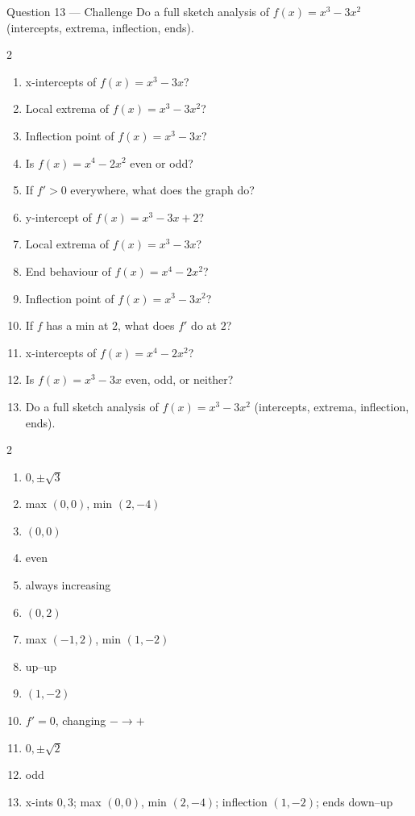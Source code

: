 \documentclass[11pt]{article}
\begin{document}
\begin{qbox}{Question 13 --- Challenge}
Do a full sketch analysis of $f(x)=x^3-3x^2$ (intercepts, extrema, inflection, ends).\workspace{4cm}
\end{qbox}

\clearpage
{}

\begin{recapbox}
\begin{multicols}{2}
\small
\begin{enumerate}[leftmargin=*,itemsep=3pt]
  \item x-intercepts of $f(x)=x^3-3x$?
  \item Local extrema of $f(x)=x^3-3x^2$?
  \item Inflection point of $f(x)=x^3-3x$?
  \item Is $f(x)=x^4-2x^2$ even or odd?
  \item If $f'>0$ everywhere, what does the graph do?
  \item y-intercept of $f(x)=x^3-3x+2$?
  \item Local extrema of $f(x)=x^3-3x$?
  \item End behaviour of $f(x)=x^4-2x^2$?
  \item Inflection point of $f(x)=x^3-3x^2$?
  \item If $f$ has a min at $2$, what does $f'$ do at $2$?
  \item x-intercepts of $f(x)=x^4-2x^2$?
  \item Is $f(x)=x^3-3x$ even, odd, or neither?
  \item Do a full sketch analysis of $f(x)=x^3-3x^2$ (intercepts, extrema, inflection, ends).
\end{enumerate}
\end{multicols}
\end{recapbox}

\begin{keybox}
\begin{multicols}{2}
\small
\begin{enumerate}[leftmargin=*,itemsep=3pt]
  \item $0,\pm\sqrt3$
  \item max $(0,0)$, min $(2,-4)$
  \item $(0,0)$
  \item even
  \item always increasing
  \item $(0,2)$
  \item max $(-1,2)$, min $(1,-2)$
  \item up–up
  \item $(1,-2)$
  \item $f'=0$, changing $-\to+$
  \item $0,\pm\sqrt2$
  \item odd
  \item x-ints $0,3$; max $(0,0)$, min $(2,-4)$; inflection $(1,-2)$; ends down–up
\end{enumerate}
\end{multicols}
\end{keybox}
\end{document}
